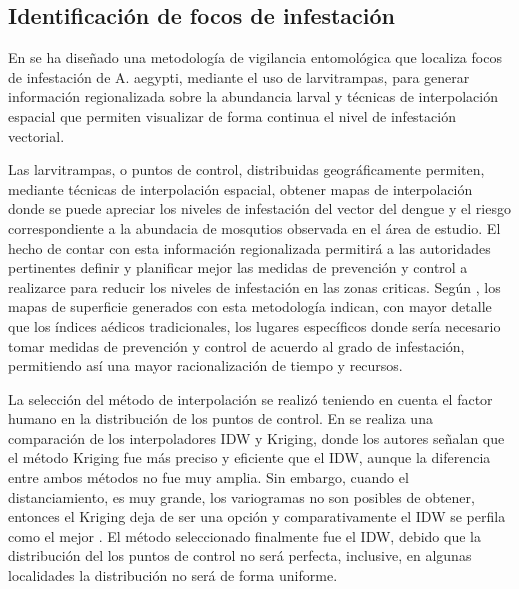 \subsection{Identificación de focos de infestación}
\label{sec:cap5-identificacion-focos}

En \citet{NINO2011} se ha diseñado una metodología de vigilancia entomológica que localiza focos
de infestación de A. aegypti, mediante el uso de larvitrampas, para generar información
regionalizada sobre la abundancia larval y técnicas de interpolación espacial que permiten
visualizar de forma continua el nivel de infestación vectorial.

Las larvitrampas, o puntos de control, distribuidas geográficamente permiten, mediante técnicas de
interpolación espacial, obtener mapas de interpolación donde se puede apreciar los niveles de
infestación del vector del dengue y el riesgo correspondiente a la abundacia de mosqutios
observada en el área de estudio. El hecho de contar con esta información regionalizada permitirá
a las autoridades pertinentes definir y planificar mejor las medidas de prevención y control a
realizarce para reducir los niveles de infestación en las zonas criticas. Según \citet{NINO2011},
los mapas de superficie generados con esta metodología indican, con mayor detalle que los índices
aédicos tradicionales, los lugares específicos donde sería necesario tomar medidas de prevención y
control de acuerdo al grado de infestación, permitiendo así una mayor racionalización de tiempo y
recursos.

La selección del método de interpolación se realizó teniendo en cuenta el factor humano en la
distribución de los puntos de control. En \citet{villatoro2007comparacion} se realiza una
comparación de los interpoladores IDW y Kriging, donde los autores señalan que el método Kriging
fue más preciso y eficiente que el IDW, aunque la diferencia entre ambos métodos no fue muy amplia.
Sin embargo, cuando el distanciamiento, es muy grande, los variogramas no son posibles
de obtener, entonces el Kriging deja de ser una opción y comparativamente el IDW se perfila como
el mejor \citep{villatoro2007comparacion}. El método seleccionado finalmente fue el IDW, debido
que la distribución del los puntos de control no será perfecta, inclusive, en algunas localidades
la distribución no será de forma uniforme.
